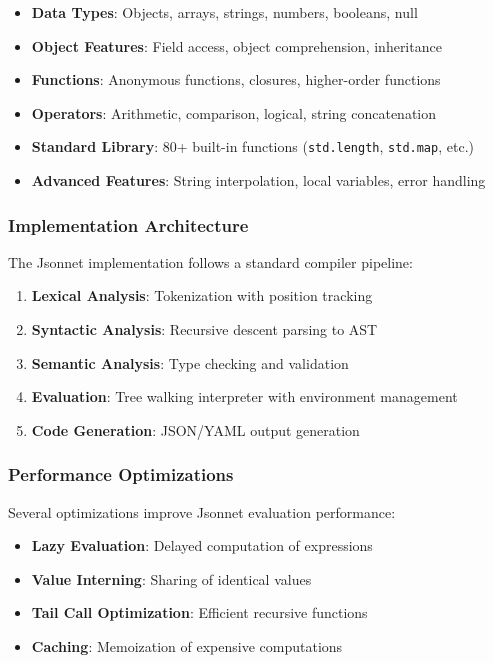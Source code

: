 \documentclass[11pt,a4paper]{article}
\begin{document}
\begin{itemize}
\item \textbf{Data Types}: Objects, arrays, strings, numbers, booleans, null
\item \textbf{Object Features}: Field access, object comprehension, inheritance
\item \textbf{Functions}: Anonymous functions, closures, higher-order functions
\item \textbf{Operators}: Arithmetic, comparison, logical, string concatenation
\item \textbf{Standard Library}: 80+ built-in functions (\texttt{std.length}, \texttt{std.map}, etc.)
\item \textbf{Advanced Features}: String interpolation, local variables, error handling
\end{itemize}

\subsubsection{Implementation Architecture}
\label{subsubsec:jsonnet_architecture}

The Jsonnet implementation follows a standard compiler pipeline:

\begin{enumerate}
\item \textbf{Lexical Analysis}: Tokenization with position tracking
\item \textbf{Syntactic Analysis}: Recursive descent parsing to AST
\item \textbf{Semantic Analysis}: Type checking and validation
\item \textbf{Evaluation}: Tree walking interpreter with environment management
\item \textbf{Code Generation}: JSON/YAML output generation
\end{enumerate}

\subsubsection{Performance Optimizations}
\label{subsubsec:jsonnet_performance}

Several optimizations improve Jsonnet evaluation performance:

\begin{itemize}
\item \textbf{Lazy Evaluation}: Delayed computation of expressions
\item \textbf{Value Interning}: Sharing of identical values
\item \textbf{Tail Call Optimization}: Efficient recursive functions
\item \textbf{Caching}: Memoization of expensive computations
\end{itemize}
\end{document}
